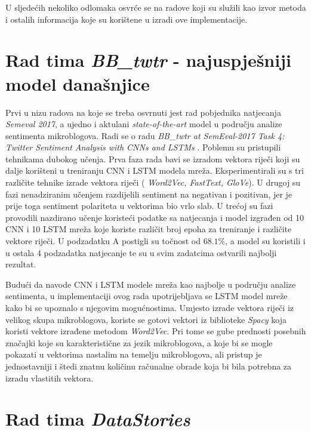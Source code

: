 \documentclass[times, utf8, zavrsni]{fer}
\begin{document}
U sljedećih nekoliko odlomaka osvrće se na radove koji su služili kao izvor metoda i ostalih informacija koje su korištene u izradi ove implementacije.

\section{Rad tima \emph{BB\_twtr} - najuspješniji model današnjice}

Prvi u nizu radova na koje se treba osvrnuti jest rad pobjednika natjecanja \emph{Semeval 2017}, a ujedno i aktulani \textit{state-of-the-art} model u području analize sentimenta mikroblogova. Radi se o radu \textit{BB\_twtr at SemEval-2017 Task 4: Twitter Sentiment Analysis with CNNs and LSTMs} \citep{cliche-2017-bb}. Poblemu su pristupili tehnikama dubokog učenja. Prva faza rada bavi se izradom vektora riječi koji su dalje korišteni u treniranju CNN i LSTM modela mreža. Eksperimentirali su s tri različite tehnike izrade vektora riječi ( \textit{Word2Vec, FastText, GloVe}). U drugoj su fazi nenadziranim učenjem razdijelili sentiment na negativan i pozitivan, jer je prije toga sentiment polariteta u vektorima bio vrlo slab. U trećoj su fazi provodili nazdirano učenje koristeći podatke sa natjecanja i model izgrađen od 10 CNN i 10 LSTM mreža koje koriste različit broj epoha za treniranje i različite vektore riječi. U podzadatku A postigli su točnost od $68.1\%$, a model su koristili i u ostala 4 podzadatka natjecanje te su u svim zadatcima ostvarili najbolji rezultat.

Budući da navode \gls{CNN} i \gls{LSTM} modele mreža kao najbolje u području analize sentimenta, u implementaciji ovog rada upotrijebljava se \gls{LSTM} model mreže kako bi se upoznalo s njegovim mogućnostima. Umjesto izrade vektora riječi iz velikog skupa mikroblogova, koriste se gotovi vektori iz biblioteke \textit{Spacy} koja koristi vektore izrađene metodom \textit{Word2Vec}. Pri tome se gube prednosti posebnih značajki koje su karakteristične za jezik mikroblogova, a koje bi se mogle pokazati u vektorima nastalim na temelju mikroblogova, ali pristup je jednostavniji i štedi znatnu količinu računalne obrade koja bi bila potrebna za izradu vlastitih vektora.

\section{Rad tima \emph{DataStories}}
\end{document}
